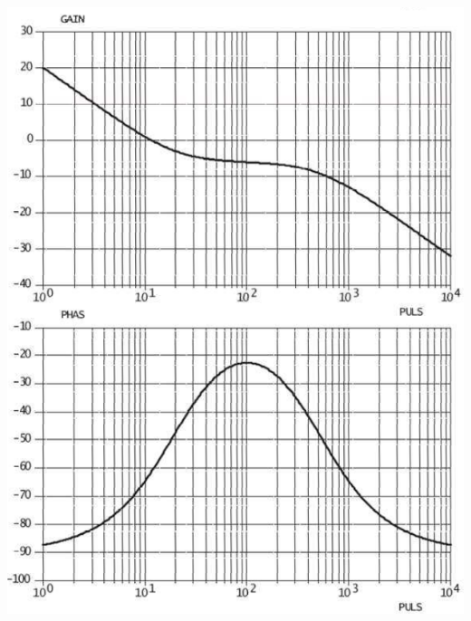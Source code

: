 \documentclass[10pt,fleqn]{article} %
\begin{document}
\begin{multicols}{2}
\begin{center}
\includegraphics[width=\linewidth]{images/img_06}
\end{center}

\ifprof
\else
\end{multicols}
\fi

\fi
\end{document}
